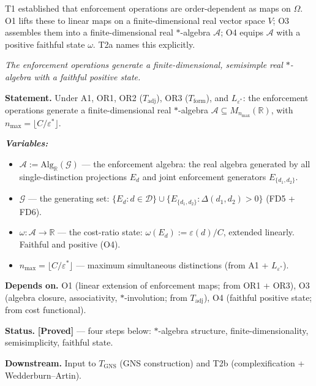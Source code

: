 \documentclass[11pt]{article}
\theoremstyle{remark}
\newenvironment{varlist}{\begin{itemize}[nosep,leftmargin=2em]}{\end{itemize}}
\begin{document}
T1 established that enforcement operations are order-dependent as maps on $\Omega$.
O1 lifts these to linear maps on a finite-dimensional real vector space $V$; O3 assembles them into a finite-dimensional real $*$-algebra $\mathcal{A}$; O4 equips $\mathcal{A}$ with a positive faithful state $\omega$.  T2a names this explicitly.

\begin{tcolorbox}[apfbox, title={T2a: Real $*$-Algebra from Enforcement Operations}]
\textit{The enforcement operations generate a finite-dimensional, semisimple real $*$-algebra with a faithful positive state.}

\smallskip\noindent\textbf{Statement.}  Under A1, OR1, OR2 ($T_{\mathrm{adj}}$), OR3 ($T_{\mathrm{form}}$), and $L_{\varepsilon^*}$: the enforcement operations generate a finite-dimensional real $*$-algebra $\mathcal{A} \subseteq M_{n_{\max}}(\mathbb{R})$, with $n_{\max} = \lfloor C/\varepsilon^*\rfloor$.

\smallskip\noindent\textbf{\textit{Variables:}}
\begin{varlist}
\item $\mathcal{A} := \mathrm{Alg}_\mathbb{R}(\mathcal{G})$ --- the enforcement algebra: the real algebra generated by all single-distinction projections $E_d$ and joint enforcement generators $E_{\{d_1,d_2\}}$.
\item $\mathcal{G}$ --- the generating set: $\{E_d : d \in \mathcal{D}\} \cup \{E_{\{d_1,d_2\}} : \Delta(d_1,d_2) > 0\}$ (FD5 + FD6).
\item $\omega: \mathcal{A} \to \mathbb{R}$ --- the cost-ratio state: $\omega(E_d) := \varepsilon(d)/C$, extended linearly.  Faithful and positive (O4).
\item $n_{\max} = \lfloor C/\varepsilon^* \rfloor$ --- maximum simultaneous distinctions (from A1 + $L_{\varepsilon^*}$).
\end{varlist}

\smallskip\noindent\textbf{Depends on.}  O1 (linear extension of enforcement maps; from OR1 + OR3), O3 (algebra closure, associativity, $*$-involution; from $T_{\mathrm{adj}}$), O4 (faithful positive state; from cost functional).

\smallskip\noindent\textbf{Status.}  \textbf{[Proved]} --- four steps below: $*$-algebra structure, finite-dimensionality, semisimplicity, faithful state.

\smallskip\noindent\textbf{Downstream.}  Input to $T_{\mathrm{GNS}}$ (GNS construction) and T2b (complexification + Wedderburn--Artin).


\end{tcolorbox}
\end{document}

